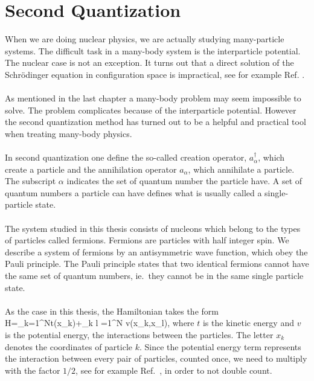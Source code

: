 \chapter{Second Quantization}
\label{chapsecondq}

When we are doing nuclear physics, we are actually studying many-particle systems. The difficult task in a many-body system 
is the interparticle potential. The nuclear case is not an exception.  
It turns out that a direct solution of the Schr\"odinger equation in configuration space is impractical, see for example Ref. \cite{fetter}.\\
\\
As mentioned in the last chapter a many-body problem may
seem impossible to solve. The problem complicates because of the interparticle potential. However the second quantization method has turned out to be a helpful and  practical tool when treating many-body physics.\\
\\
In second quantization one define the so-called creation operator,
$a^\dagger_\alpha$, which create a particle  and the annihilation operator
$a_\alpha$, which annihilate a particle. The subscript $\alpha$ indicates the
set of quantum number the particle have. A set of quantum numbers a particle
can have defines what is usually called a single-particle state.\\
\\
The system studied in this thesis consists of nucleons which belong to the types
of particles called fermions. Fermions are particles with half integer spin. We
describe a system of fermions by an antisymmetric wave function, which
obey the Pauli principle. The Pauli principle states that two identical fermions
cannot have the same set of quantum numbers, ie.~they cannot be in the same
single particle state.\\
\\
As the case in this thesis, the
Hamiltonian takes the form \be H=\sum_{k=1}^Nt(x_k)+\sum_{k \neq l
=1}^N v(x_k,x_l), \label{hamfirst} \ee  where $t$ is the kinetic energy and $v$
is the potential energy, the interactions between the particles. The letter
$x_k$ denotes the coordinates of particle $k$.  Since the potential energy term
represents the interaction between every pair of particles, counted once, we
need to multiply with the factor  $1/2$, see for example Ref.~\cite{fetter}, in
order to not double count.

